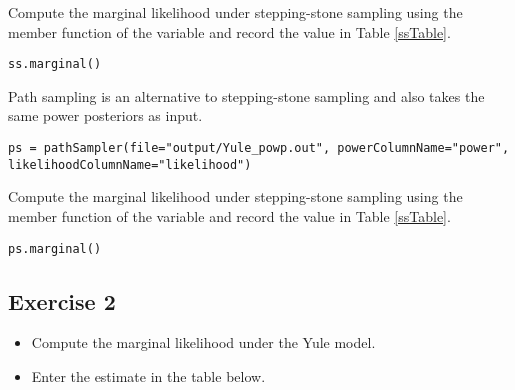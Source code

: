 Compute the marginal likelihood under stepping-stone sampling using the member function  of the  variable and record the value in Table \ref{ssTable}.
{\tt \begin{snugshade*}
\begin{lstlisting}
ss.marginal() 
\end{lstlisting}
\end{snugshade*}}

Path sampling is an alternative to stepping-stone sampling and also takes the same power posteriors as input. 
{\tt \small \begin{snugshade*}
\begin{lstlisting}
ps = pathSampler(file="output/Yule_powp.out", powerColumnName="power", likelihoodColumnName="likelihood")
\end{lstlisting}
\end{snugshade*}}

Compute the marginal likelihood under stepping-stone sampling using the member function  of the  variable and record the value in Table \ref{ssTable}.
{\tt \begin{snugshade*}
\begin{lstlisting}
ps.marginal() 
\end{lstlisting}
\end{snugshade*}}



\subsection{Exercise 2}

\begin{itemize}
\item Compute the marginal likelihood under the Yule model.
\item Enter the estimate in the table below.
\end{itemize}

